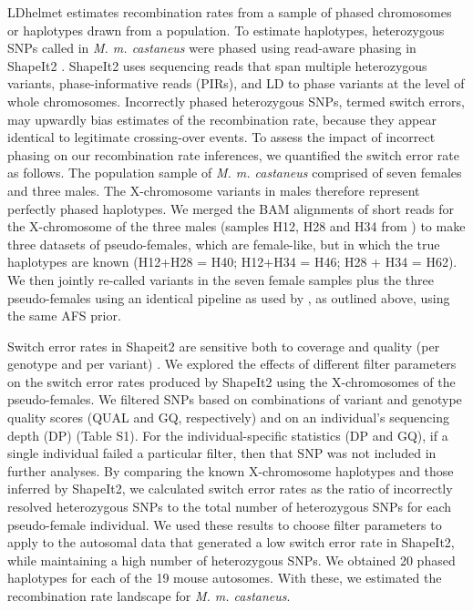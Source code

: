 LDhelmet estimates recombination rates from a sample of phased chromosomes or haplotypes drawn from a population. To estimate haplotypes, heterozygous SNPs called in \emph{M. m. castaneus} were phased using read-aware phasing in ShapeIt2 \citep{RN231}. ShapeIt2 uses sequencing reads that span multiple heterozygous variants, phase-informative reads (PIRs), and LD to phase variants at the level of whole chromosomes. Incorrectly phased heterozygous SNPs, termed switch errors, may upwardly bias estimates of the recombination rate, because they appear identical to legitimate crossing-over events. To assess the impact of incorrect phasing on our recombination rate inferences, we quantified the switch error rate as follows. The population sample of \emph{M. m. castaneus} comprised of seven females and three males. The X-chromosome variants in males therefore represent perfectly phased haplotypes. We merged the BAM alignments of short reads for the X-chromosome of the three males (samples H12, H28 and H34 from \citealt{RN122}) to make three datasets of pseudo-females, which are female-like, but in which the true haplotypes are known (H12+H28 = H40; H12+H34 = H46; H28 + H34 = H62). We then jointly re-called variants in the seven female samples plus the three pseudo-females using an identical pipeline as used by \cite{RN122}, as outlined above, using the same AFS prior.
 
Switch error rates in Shapeit2 are sensitive both to coverage and quality (per genotype and per variant) \citep{RN231}. We explored the effects of different filter parameters on the switch error rates produced by ShapeIt2 using the X-chromosomes of the pseudo-females. We filtered SNPs based on combinations of variant and genotype quality scores (QUAL and GQ, respectively) and on an individual’s sequencing depth (DP) (Table S1). For the individual-specific statistics (DP and GQ), if a single individual failed a particular filter, then that SNP was not included in further analyses. By comparing the known X-chromosome haplotypes and those inferred by ShapeIt2, we calculated switch error rates as the ratio of incorrectly resolved heterozygous SNPs to the total number of heterozygous SNPs for each pseudo-female individual. We used these results to choose filter parameters to apply to the autosomal data that generated a low switch error rate in ShapeIt2, while maintaining a high number of heterozygous SNPs. We obtained 20 phased haplotypes for each of the 19 mouse autosomes. With these, we estimated the recombination rate landscape for \emph{M. m. castaneus}.
 
